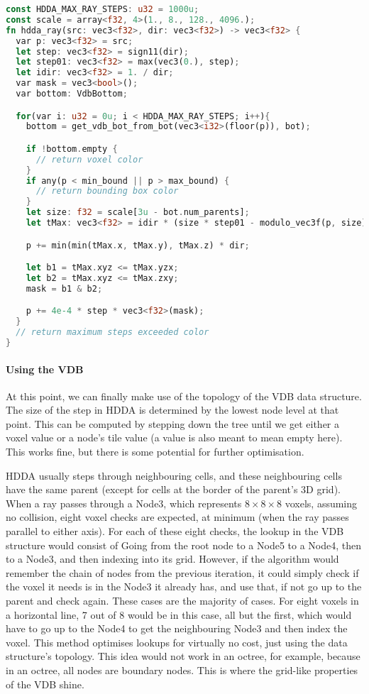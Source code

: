 \begin{lstlisting}[language=rust, captionpos=b, caption={\texttt{HDDA} algorithm}, label={hdda:code}]
const HDDA_MAX_RAY_STEPS: u32 = 1000u;
const scale = array<f32, 4>(1., 8., 128., 4096.);
fn hdda_ray(src: vec3<f32>, dir: vec3<f32>) -> vec3<f32> {
  var p: vec3<f32> = src;
  let step: vec3<f32> = sign11(dir);
  let step01: vec3<f32> = max(vec3(0.), step);
  let idir: vec3<f32> = 1. / dir;
  var mask = vec3<bool>();
  var bottom: VdbBottom;

  for(var i: u32 = 0u; i < HDDA_MAX_RAY_STEPS; i++){
    bottom = get_vdb_bot_from_bot(vec3<i32>(floor(p)), bot);

    if !bottom.empty {
      // return voxel color
    }
    if any(p < min_bound || p > max_bound) {
      // return bounding box color
    }
    let size: f32 = scale[3u - bot.num_parents];
    let tMax: vec3<f32> = idir * (size * step01 - modulo_vec3f(p, size));

    p += min(min(tMax.x, tMax.y), tMax.z) * dir;

    let b1 = tMax.xyz <= tMax.yzx;
    let b2 = tMax.xyz <= tMax.zxy;
    mask = b1 & b2;

    p += 4e-4 * step * vec3<f32>(mask);
  }
  // return maximum steps exceeded color
}
\end{lstlisting}

\paragraph{Using the VDB}
At this point, we can finally make use of the topology of the VDB data structure.
The size of the step in HDDA is determined by the lowest node level at that point.
This can be computed by stepping down the tree until we get either a voxel value or a node's tile value (a value is also meant to mean empty here).
This works fine, but there is some potential for further optimisation.

HDDA usually steps through neighbouring cells, and these neighbouring cells have the same parent (except for cells at the border of the parent's 3D grid).
When a ray passes through a Node3, which represents $8\times8\times8$ voxels, assuming no collision, eight voxel checks are expected, at minimum (when the ray passes parallel to either axis).
For each of these eight checks, the lookup in the VDB structure would consist of Going from the root node to a Node5 to a Node4, then to a Node3, and then indexing into its grid.
However, if the algorithm would remember the chain of nodes from the previous iteration, it could simply check if the voxel it needs is in the Node3 it already has, and use that, if not go up to the parent and check again. These cases are the majority of cases. For eight voxels in a horizontal line, 7 out of 8 would be in this case,
all but the first, which would have to go up to the Node4 to get the neighbouring Node3 and then index the voxel.
This method optimises lookups for virtually no cost, just using the data structure's topology. This idea would not work in an octree, for example, because in an octree, all nodes are boundary nodes.
This is where the grid-like properties of the VDB shine.

